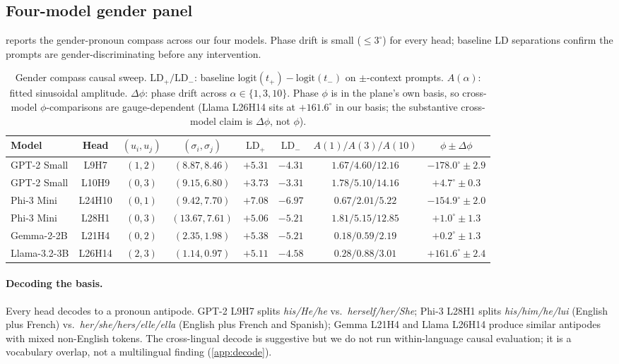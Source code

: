 \subsection{Four-model gender panel}
\label{sec:results:gender}

 reports the gender-pronoun compass across our four
models. Phase drift is small ($\leq 3^\circ$) for every head; baseline
LD separations confirm the prompts are gender-discriminating before
any intervention.

\begin{table}[t]
\centering
\small
\caption{Gender compass causal sweep. $\mathrm{LD}_+/\mathrm{LD}_-$:
baseline $\mathrm{logit}(t_+) - \mathrm{logit}(t_-)$ on $\pm$-context
prompts. $A(\alpha)$: fitted sinusoidal amplitude. $\Delta\phi$:
phase drift across $\alpha \in \{1, 3, 10\}$. Phase $\phi$ is in the
plane's own basis, so cross-model $\phi$-comparisons are
gauge-dependent (Llama L26H14 sits at $+161.6^\circ$ in our basis;
the substantive cross-model claim is $\Delta\phi$, not $\phi$).}
\label{tab:gender}
\begin{tabular}{lccccccc}
\toprule
Model & Head & $(u_i, u_j)$ & $(\sigma_i, \sigma_j)$ &
$\mathrm{LD}_+$ & $\mathrm{LD}_-$ &
$A(1)/A(3)/A(10)$ & $\phi \pm \Delta\phi$ \\
\midrule
GPT-2 Small  & L9H7   & $(1,2)$ & $(8.87, 8.46)$  & $+5.31$ & $-4.31$ &
$1.67/4.60/12.16$ & $-178.0^\circ \pm 2.9$ \\
GPT-2 Small  & L10H9  & $(0,3)$ & $(9.15, 6.80)$  & $+3.73$ & $-3.31$ &
$1.78/5.10/14.16$ & $+4.7^\circ \pm 0.3$ \\
Phi-3 Mini   & L24H10 & $(0,1)$ & $(9.42, 7.70)$  & $+7.08$ & $-6.97$ &
$0.67/2.01/5.22$  & $-154.9^\circ \pm 2.0$ \\
Phi-3 Mini   & L28H1  & $(0,3)$ & $(13.67, 7.61)$ & $+5.06$ & $-5.21$ &
$1.81/5.15/12.85$ & $+1.0^\circ \pm 1.3$ \\
Gemma-2-2B   & L21H4  & $(0,2)$ & $(2.35, 1.98)$  & $+5.38$ & $-5.21$ &
$0.18/0.59/2.19$  & $+0.2^\circ \pm 1.3$ \\
Llama-3.2-3B & L26H14 & $(2,3)$ & $(1.14, 0.97)$  & $+5.11$ & $-4.58$ &
$0.28/0.88/3.01$  & $+161.6^\circ \pm 2.4$ \\
\bottomrule
\end{tabular}
\end{table}

\paragraph{Decoding the basis.}
Every head decodes to a pronoun antipode. GPT-2 L9H7 splits
\emph{his/He/he} vs.\ \emph{herself/her/She}; Phi-3 L28H1 splits
\emph{his/him/he/lui} (English plus French) vs.\
\emph{her/she/hers/elle/ella} (English plus French and Spanish);
Gemma L21H4 and Llama L26H14 produce similar antipodes with mixed
non-English tokens. The cross-lingual decode is suggestive but we
do not run within-language causal evaluation; it is a vocabulary
overlap, not a multilingual finding (\cref{app:decode}).

